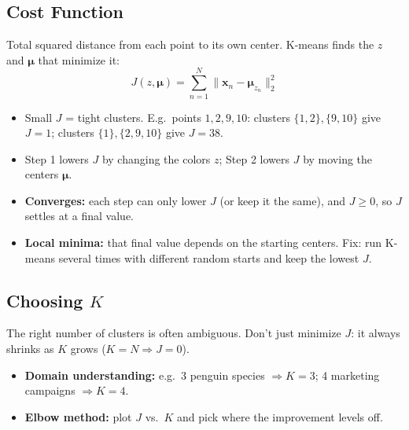 \subsection*{Cost Function}
Total squared distance from each point to its own center. K-means finds the $z$ and $\boldsymbol{\mu}$ that minimize it:
\[
J(z, \boldsymbol{\mu}) = \sum_{n=1}^{N} \|\mathbf{x}_n - \boldsymbol{\mu}_{z_n}\|_2^2
\]
\begin{itemize}
  \item Small $J$ = tight clusters. E.g.\ points $1, 2, 9, 10$: clusters $\{1,2\},\{9,10\}$ give $J = 1$; clusters $\{1\},\{2,9,10\}$ give $J = 38$.
  \item Step 1 lowers $J$ by changing the colors $z$; Step 2 lowers $J$ by moving the centers $\boldsymbol{\mu}$.
  \item \textbf{Converges:} each step can only lower $J$ (or keep it the same), and $J \geq 0$, so $J$ settles at a final value.
  \item \textbf{Local minima:} that final value depends on the starting centers. Fix: run K-means several times with different random starts and keep the lowest $J$.
\end{itemize}

\subsection*{Choosing $K$}
The right number of clusters is often ambiguous. Don't just minimize $J$: it always shrinks as $K$ grows ($K = N \Rightarrow J = 0$).
\begin{itemize}
  \item \textbf{Domain understanding:} e.g.\ 3 penguin species $\Rightarrow K = 3$; 4 marketing campaigns $\Rightarrow K = 4$.
  \item \textbf{Elbow method:} plot $J$ vs.\ $K$ and pick where the improvement levels off.
\end{itemize}

{\centering
{}
\par}
